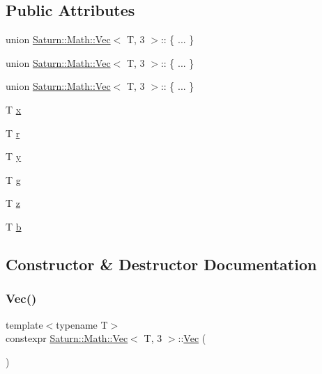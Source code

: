 \subsection*{Public Attributes}
\begin{DoxyCompactItemize}
\item 
union \mbox{\hyperlink{class_saturn_1_1_math_1_1_vec}{Saturn\+::\+Math\+::\+Vec}}$<$ T, 3 $>$\+:: \{ ... \}  
\item 
union \mbox{\hyperlink{class_saturn_1_1_math_1_1_vec}{Saturn\+::\+Math\+::\+Vec}}$<$ T, 3 $>$\+:: \{ ... \}  
\item 
union \mbox{\hyperlink{class_saturn_1_1_math_1_1_vec}{Saturn\+::\+Math\+::\+Vec}}$<$ T, 3 $>$\+:: \{ ... \}  
\item 
T \mbox{\hyperlink{class_saturn_1_1_math_1_1_vec_3_01_t_00_013_01_4_a812da3affee3794611d1b6a660bac4fd}{x}}
\item 
T \mbox{\hyperlink{class_saturn_1_1_math_1_1_vec_3_01_t_00_013_01_4_afe7ba7897752a0f45bb8015c7f76d7e9}{r}}
\item 
T \mbox{\hyperlink{class_saturn_1_1_math_1_1_vec_3_01_t_00_013_01_4_aafffbaba5d24cee4fc80e9b7ca1db5a4}{y}}
\item 
T \mbox{\hyperlink{class_saturn_1_1_math_1_1_vec_3_01_t_00_013_01_4_aa13ed9474f1a239d4124571421275edd}{g}}
\item 
T \mbox{\hyperlink{class_saturn_1_1_math_1_1_vec_3_01_t_00_013_01_4_af2f3567df19bf4323973a2b0fd217cad}{z}}
\item 
T \mbox{\hyperlink{class_saturn_1_1_math_1_1_vec_3_01_t_00_013_01_4_ac6a164b4c8a8232e4176c5e80d2e0f14}{b}}
\end{DoxyCompactItemize}


\subsection{Constructor \& Destructor Documentation}
\mbox{\label{class_saturn_1_1_math_1_1_vec_3_01_t_00_013_01_4_a8e578ef15ecacc4c9c9f3ec5604c95ef}} 
\subsubsection{\texorpdfstring{Vec()}{Vec()}\hspace{0.1cm}{\footnotesize\ttfamily [1/4]}}
{\footnotesize\ttfamily template$<$typename T$>$ \\
constexpr \mbox{\hyperlink{class_saturn_1_1_math_1_1_vec}{Saturn\+::\+Math\+::\+Vec}}$<$ T, 3 $>$\+::\mbox{\hyperlink{class_saturn_1_1_math_1_1_vec}{Vec}} (\begin{DoxyParamCaption}{ }\end{DoxyParamCaption})\hspace{0.3cm}{\ttfamily [inline]}}

